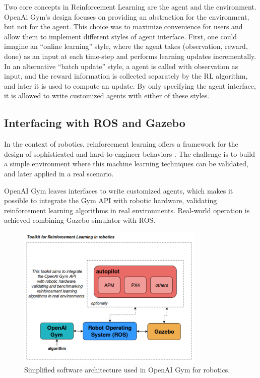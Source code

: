 Two core concepts in Reinforcement Learning are the agent and the environment. OpenAi Gym's design focuses on providing an abstraction for the environment, but not for the agent. This choice was to maximize convenience for users and allow them to implement different styles of agent interface. First, one could imagine an ``online learning'' style, where the agent takes (observation, reward, done) as an input at each time-step and performs learning updates incrementally. In an alternative ``batch update'' style, a agent is called with observation as input, and the reward information is collected separately by the RL algorithm, and later it is used to compute an update. By only specifying the agent interface, it is allowed to write customized agents with either of these styles.

\subsection{Interfacing with ROS and Gazebo}

In the context of robotics, reinforcement learning offers a framework for the design of sophisticated and hard-to-engineer behaviors \cite{RLsurvey2013}. The challenge is to build a simple environment where this machine learning techniques can be validated, and later applied in a real scenario.

OpenAI Gym leaves interfaces to write customized agents, which makes it possible to integrate the Gym API with robotic hardware, validating reinforcement learning algorithms in real environments. Real-world operation is achieved combining Gazebo simulator with ROS.

\begin{figure}[h]
\centering
\includegraphics[width=0.8\textwidth]{figs/ch2/toolkit-of-openaigym}
\caption{Simplified software architecture used in OpenAI Gym for robotics.}
\label{fig:openai-archi}
\end{figure}

